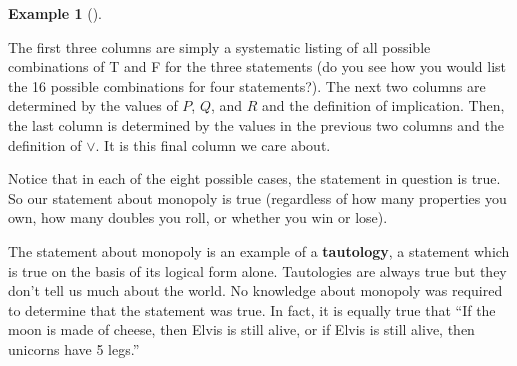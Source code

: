 \documentclass[10pt,]{book}
\newcommand{\terminology}[1]{\textbf{#1}}
\theoremstyle{plain}
\theoremstyle{definition}
\theoremstyle{definition}
\newtheorem{example}[theorem]{Example}
\theoremstyle{definition}
\numberwithin{equation}{chapter}
\begin{document}
\begin{example}[]
\par
\hypertarget{p-2294}{}%
The first three columns are simply a systematic listing of all possible combinations of T and F for the three statements (do you see how you would list the 16 possible combinations for four statements?). The next two columns are determined by the values of \(P\), \(Q\), and \(R\) and the definition of implication. Then, the last column is determined by the values in the previous two columns and the definition of \(\vee\). It is this final column we care about.%
\par
\hypertarget{p-2295}{}%
Notice that in each of the eight possible cases, the statement in question is true. So our statement about monopoly is true (regardless of how many properties you own, how many doubles you roll, or whether you win or lose).%
\end{example}
\hypertarget{p-2296}{}%
The statement about monopoly is an example of a \terminology{tautology}, a statement which is true on the basis of its logical form alone. Tautologies are always true but they don't tell us much about the world. No knowledge about monopoly was required to determine that the statement was true. In fact, it is equally true that ``If the moon is made of cheese, then Elvis is still alive, or if Elvis is still alive, then unicorns have 5 legs.''%
\typeout{************************************************}
\typeout{************************************************}
\end{document}
